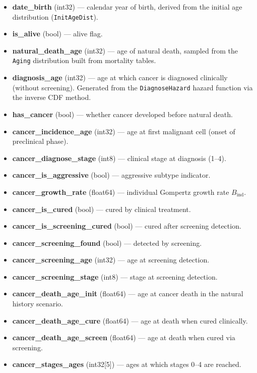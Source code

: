 \documentclass[12pt,a4paper]{article}
\begin{document}
\begin{itemize}[nosep]
    \item \textbf{date\_birth} (int32) — calendar year of birth, derived from the initial age distribution (\texttt{InitAgeDist}).
    \item \textbf{is\_alive} (bool) — alive flag.
    \item \textbf{natural\_death\_age} (int32) — age of natural death, sampled from the \texttt{Aging} distribution built from mortality tables.
    \item \textbf{diagnosis\_age} (int32) — age at which cancer is diagnosed clinically (without screening). Generated from the \texttt{DiagnoseHazard} hazard function via the inverse CDF method.
    \item \textbf{has\_cancer} (bool) — whether cancer developed before natural death.
    \item \textbf{cancer\_incidence\_age} (int32) — age at first malignant cell (onset of preclinical phase).
    \item \textbf{cancer\_diagnose\_stage} (int8) — clinical stage at diagnosis (1--4).
    \item \textbf{cancer\_is\_aggressive} (bool) — aggressive subtype indicator.
    \item \textbf{cancer\_growth\_rate} (float64) — individual Gompertz growth rate $B_{\text{ind}}$.
    \item \textbf{cancer\_is\_cured} (bool) — cured by clinical treatment.
    \item \textbf{cancer\_is\_screening\_cured} (bool) — cured after screening detection.
    \item \textbf{cancer\_screening\_found} (bool) — detected by screening.
    \item \textbf{cancer\_screening\_age} (int32) — age at screening detection.
    \item \textbf{cancer\_screening\_stage} (int8) — stage at screening detection.
    \item \textbf{cancer\_death\_age\_init} (float64) — age at cancer death in the natural history scenario.
    \item \textbf{cancer\_death\_age\_cure} (float64) — age at death when cured clinically.
    \item \textbf{cancer\_death\_age\_screen} (float64) — age at death when cured via screening.
    \item \textbf{cancer\_stages\_ages} (int32[5]) — ages at which stages 0--4 are reached.
\end{itemize}
\end{document}
